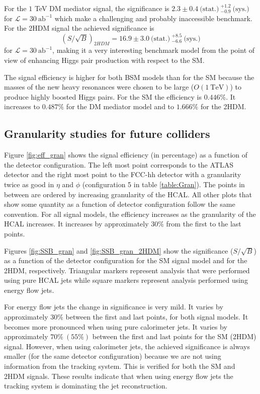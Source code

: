 For the $1$ TeV DM mediator signal, the significance is $2.3\pm0.4~\text{(stat.)}~^{+1.2}_{-0.9}~\text{(sys.)}$ for $\mathcal{L}=30~\text{ab}^{-1}$ which make a challenging and probably inaccessible benchmark. For the 2HDM signal the achieved significance is 
\begin{equation}
	(S/\sqrt{B})_{2HDM}=16.9\pm 3.0~\text{(stat.)}~^{+8.5}_{-6.6}~\text{(sys.)}
\end{equation}
for $\mathcal{L}=30~\text{ab}^{-1}$, making it a very interesting benchmark model from the point of view of enhancing Higgs pair production with respect to the SM. 

The signal efficiency is higher for both BSM models than for the SM because the masses of the new heavy resonances were chosen to be large ($O(1 ~\text{TeV})$) to produce highly boosted Higgs pairs. For the SM the efficiency is $0.446\%$. It increases to $0.487\%$ for the DM mediator model and to $1.666\%$ for the 2HDM. 

\subsection{Granularity studies for future colliders}
\label{sec:gran_studies}

Figure \ref{fig:eff_gran} shows the signal efficiency (in percentage) as a function of the detector configuration. The left most point corresponds to the ATLAS detector and the right most point to the FCC-hh detector with a granularity twice as good in $\eta$ and $\phi$ (configuration 5 in table \ref{table:Gran}). The points in between are ordered by increasing granularity of the HCAL. All other plots that show some quantity as a function of detector configuration follow the same convention. For all signal models, the efficiency increases as the granularity of the HCAL increases. It increases by approximately $30\%$ from the first to the last points.

Figures \ref{fig:SSB_gran} and \ref{fig:SSB_gran_2HDM} show the significance ($S/\sqrt{B}$) as a function of the detector configuration for the SM signal model and for the 2HDM, respectively. Triangular markers represent analysis that were performed using pure HCAL jets while square markers represent analysis performed using energy flow jets. 

For energy flow jets the change in significance is very mild. It varies by approximately $30\%$ between the first and last points, for both signal models. It becomes more pronounced when using pure calorimeter jets. It varies by approximately $70\%~(55\%)$ between the first and last points for the SM (2HDM) signal. However, when using calorimeter jets, the achieved significance is always smaller (for the same detector configuration) because we are not using information from the tracking system. This is verified for both the SM and 2HDM signals. These results indicate that when using energy flow jets the tracking system is dominating the jet reconstruction.

